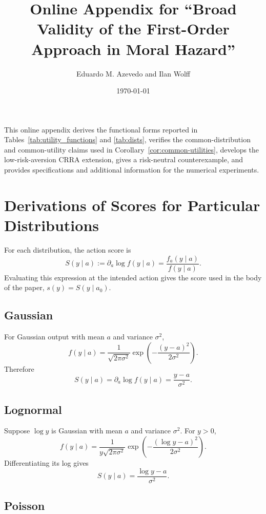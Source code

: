 \documentclass[12pt]{article}
\begin{document}
\title{Online Appendix for ``Broad Validity of the First-Order Approach in Moral Hazard''}
\author{Eduardo M. Azevedo and Ilan Wolff}
\date{\today}
\maketitle

\tableofcontents
\newpage

This online appendix derives the functional forms reported in Tables~\ref{tab:utility_functions} and \ref{tab:dists}, verifies the common-distribution
and common-utility claims used in Corollary~\ref{cor:common-utilities}, develops
the low-risk-aversion CRRA extension, gives a risk-neutral counterexample, and
provides specifications and additional information for the numerical experiments.

\section{Derivations of Scores for Particular Distributions}

For each distribution, the action score is
\[
    S(y\mid a):=\partial_a\log f(y\mid a)
    =\frac{f_a(y\mid a)}{f(y\mid a)}.
\]
Evaluating this expression at the intended action gives the score used in the
body of the paper, $s(y)=S(y\mid a_0)$.

\subsection{Gaussian}

For Gaussian output with mean $a$ and variance $\sigma^2$,
\[
    f(y\mid a)
    =\frac{1}{\sqrt{2\pi\sigma^2}}
      \exp\left(-\frac{(y-a)^2}{2\sigma^2}\right).
\]
Therefore
\[
    S(y\mid a)
    =\partial_a\log f(y\mid a)
    =\frac{y-a}{\sigma^2}.
\]

\subsection{Lognormal}

Suppose $\log y$ is Gaussian with mean $a$ and variance $\sigma^2$.  For
$y>0$,
\[
    f(y\mid a)
    =\frac{1}{y\sqrt{2\pi\sigma^2}}
      \exp\left(-\frac{(\log y-a)^2}{2\sigma^2}\right).
\]
Differentiating its log gives
\[
    S(y\mid a)=\frac{\log y-a}{\sigma^2}.
\]

\subsection{Poisson}
\end{document}
